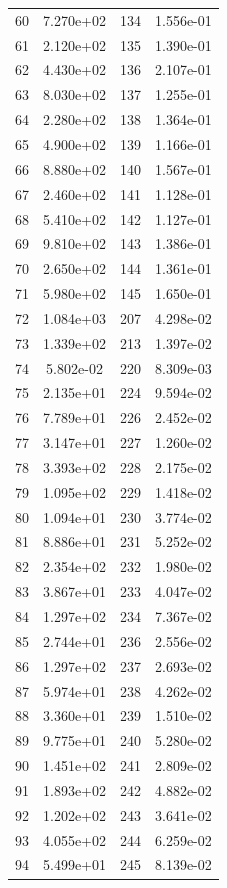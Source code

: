 \documentclass[12pt]{article}
\begin{document}
\begin{longtable}{@{}cccc@{}}
60 & 7.270e+02 & 134 & 1.556e-01 \\
61 & 2.120e+02 & 135 & 1.390e-01 \\
62 & 4.430e+02 & 136 & 2.107e-01 \\
63 & 8.030e+02 & 137 & 1.255e-01 \\
64 & 2.280e+02 & 138 & 1.364e-01 \\
65 & 4.900e+02 & 139 & 1.166e-01 \\
66 & 8.880e+02 & 140 & 1.567e-01 \\
67 & 2.460e+02 & 141 & 1.128e-01 \\
68 & 5.410e+02 & 142 & 1.127e-01 \\
69 & 9.810e+02 & 143 & 1.386e-01 \\
70 & 2.650e+02 & 144 & 1.361e-01 \\
71 & 5.980e+02 & 145 & 1.650e-01 \\
72 & 1.084e+03 & 207 & 4.298e-02 \\
73 & 1.339e+02 & 213 & 1.397e-02 \\
74 & 5.802e-02 & 220 & 8.309e-03 \\
75 & 2.135e+01 & 224 & 9.594e-02 \\
76 & 7.789e+01 & 226 & 2.452e-02 \\
77 & 3.147e+01 & 227 & 1.260e-02 \\
78 & 3.393e+02 & 228 & 2.175e-02 \\
79 & 1.095e+02 & 229 & 1.418e-02 \\
80 & 1.094e+01 & 230 & 3.774e-02 \\
81 & 8.886e+01 & 231 & 5.252e-02 \\
82 & 2.354e+02 & 232 & 1.980e-02 \\
83 & 3.867e+01 & 233 & 4.047e-02 \\
84 & 1.297e+02 & 234 & 7.367e-02 \\
85 & 2.744e+01 & 236 & 2.556e-02 \\
86 & 1.297e+02 & 237 & 2.693e-02 \\
87 & 5.974e+01 & 238 & 4.262e-02 \\
88 & 3.360e+01 & 239 & 1.510e-02 \\
89 & 9.775e+01 & 240 & 5.280e-02 \\
90 & 1.451e+02 & 241 & 2.809e-02 \\
91 & 1.893e+02 & 242 & 4.882e-02 \\
92 & 1.202e+02 & 243 & 3.641e-02 \\
93 & 4.055e+02 & 244 & 6.259e-02 \\
94 & 5.499e+01 & 245 & 8.139e-02 \\

\end{longtable}
\end{document}
